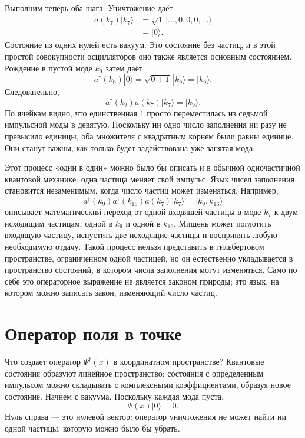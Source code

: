 Выполним теперь оба шага. Уничтожение даёт
\begin{align}
a(k_7)|k_7\rangle
&=
\sqrt{1}\,|\ldots,0,0,0,\ldots\rangle\\
&=|0\rangle.
\end{align}
Состояние из одних нулей есть вакуум. Это состояние без частиц, и в этой простой совокупности осцилляторов оно также является основным состоянием. Рождение в пустой моде \(k_9\) затем даёт
\begin{equation}
a^\dagger(k_9)|0\rangle
=\sqrt{0+1}\,|k_9\rangle
=|k_9\rangle.
\end{equation}
Следовательно,
\begin{equation}
a^\dagger(k_9)a(k_7)|k_7\rangle=|k_9\rangle.
\end{equation}
По ячейкам видно, что единственная \(1\) просто переместилась из седьмой импульсной моды в девятую. Поскольку ни одно число заполнения ни разу не превысило единицы, оба множителя с квадратным корнем были равны единице. Они станут важны, как только будет задействована уже занятая мода.

Этот процесс «один в один» можно было бы описать и в обычной одночастичной квантовой механике: одна частица меняет свой импульс. Язык чисел заполнения становится незаменимым, когда число частиц может изменяться. Например,
\begin{equation}
a^\dagger(k_9)a^\dagger(k_{16})a(k_7)|k_7\rangle
=|k_9,k_{16}\rangle
\end{equation}
описывает математический переход от одной входящей частицы в моде \(k_7\) к двум исходящим частицам, одной в \(k_9\) и одной в \(k_{16}\). Мишень может поглотить входящую частицу, испустить две исходящие частицы и воспринять любую необходимую отдачу. Такой процесс нельзя представить в гильбертовом пространстве, ограниченном одной частицей, но он естественно укладывается в пространство состояний, в котором числа заполнения могут изменяться. Само по себе это операторное выражение не является законом природы; это язык, на котором можно записать закон, изменяющий число частиц.

\section{Оператор поля в точке}

Что создает оператор \(\Psi^\dagger(x)\) в координатном пространстве? Квантовые состояния образуют линейное пространство: состояния с определенным импульсом можно складывать с комплексными коэффициентами, образуя новое состояние. Начнем с вакуума. Поскольку каждая мода пуста,
\begin{equation}
\Psi(x)|0\rangle=0.
\end{equation}
Нуль справа — это нулевой вектор: оператор уничтожения не может найти ни одной частицы, которую можно было бы убрать.

